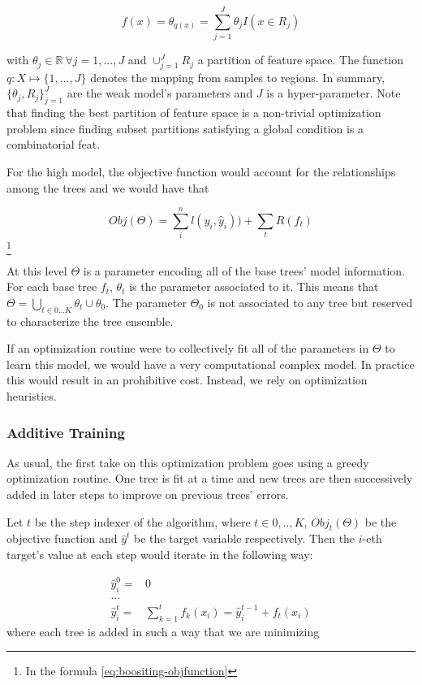 \documentclass{article}%
\theoremstyle{definition}
\begin{document}
\[
f(x) = \theta_{q(x)} = \sum_{j=1}^J \theta_j I(x \in  R_j)
\]

with $\theta_j \in \mathbb{R} \ \forall j = 1,...,J$ and $ \cup_{j=1}^J R_j$ a partition of feature space. The function $q : X \mapsto \{1,...,J\}$ denotes the mapping from samples to regions. In summary, $\{\theta_j, R_j\}_{j=1}^J$ are the weak model's parameters and $J$ is a hyper-parameter. Note that finding the best partition of feature space is a non-trivial optimization problem since finding subset partitions satisfying a global condition is a combinatorial feat.

For the high model, the objective function would account for the relationships among the trees and we would have that

\[ Obj(\Theta) = \sum_i^n l(y_i,\hat{y}_i))  +  \sum_t R(f_t) \] \label{eq:boositing-objfunction} \footnote{In the formula \ref{eq:boositing-objfunction} }
%    

At this level $\Theta$ is a parameter encoding all of the base trees' model information. For each base tree $f_t$, $\theta_t$ is the parameter associated to it. This means that $\Theta =  \bigcup_{t \in {0...K}} \theta_t  \cup \theta_0$.  The parameter $\Theta_0$ is not associated to any tree but reserved to characterize the tree ensemble. 

If an optimization routine were to collectively fit all of the parameters in $\Theta$ to learn this model, we would have a very computational complex model. In practice this would result in an prohibitive cost. Instead, we rely on optimization heuristics. 

\subsubsection{Additive Training}

As usual, the first take on this optimization problem goes using a greedy optimization routine. One tree is fit at a time and new trees are then successively added in later steps to improve on previous trees' errors.

Let $t$ be the step indexer of the algorithm, where $t \in {0,..,K}$, $Obj_t(\Theta)$ be the objective function and $\hat{y}^t$ be the target variable respectively. Then the $i$-eth target's value at each step would iterate in the following way:

\begin{equation} \label{eq:gb-targetSteps}
\begin{split}
\hat{y}_i^0 = & 0 \\
... \\ 
\hat{y}_i^t = &\sum_{k=1}^{t} f_k(x_i) = \hat{y}^{t-1}_i +  f_t(x_i)
\end{split}
\end{equation}
where each tree is added in such a way that we are minimizing
\end{document}
